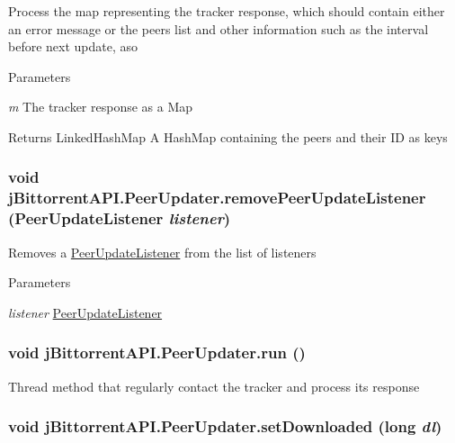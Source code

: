Process the map representing the tracker response, which should contain either an error message or the peers list and other information such as the interval before next update, aso 
\begin{DoxyParams}{Parameters}
\item[{\em m}]The tracker response as a Map \end{DoxyParams}
\begin{DoxyReturn}{Returns}
LinkedHashMap A HashMap containing the peers and their ID as keys 
\end{DoxyReturn}
\hypertarget{classj_bittorrent_a_p_i_1_1_peer_updater_adb6e86e7512b62f68d86dd2c124277cb}{
\subsubsection[{removePeerUpdateListener}]{\setlength{\rightskip}{0pt plus 5cm}void jBittorrentAPI.PeerUpdater.removePeerUpdateListener ({\bf PeerUpdateListener} {\em listener})}}
\label{classj_bittorrent_a_p_i_1_1_peer_updater_adb6e86e7512b62f68d86dd2c124277cb}
Removes a \hyperlink{interfacej_bittorrent_a_p_i_1_1_peer_update_listener}{PeerUpdateListener} from the list of listeners 
\begin{DoxyParams}{Parameters}
\item[{\em listener}]\hyperlink{interfacej_bittorrent_a_p_i_1_1_peer_update_listener}{PeerUpdateListener} \end{DoxyParams}
\hypertarget{classj_bittorrent_a_p_i_1_1_peer_updater_ae394e8d995d2c0e21377356b5fe6bd20}{
\subsubsection[{run}]{\setlength{\rightskip}{0pt plus 5cm}void jBittorrentAPI.PeerUpdater.run ()}}
\label{classj_bittorrent_a_p_i_1_1_peer_updater_ae394e8d995d2c0e21377356b5fe6bd20}
Thread method that regularly contact the tracker and process its response \hypertarget{classj_bittorrent_a_p_i_1_1_peer_updater_a2e61605bc665ddcbd7eb27818e736757}{
\subsubsection[{setDownloaded}]{\setlength{\rightskip}{0pt plus 5cm}void jBittorrentAPI.PeerUpdater.setDownloaded (long {\em dl})}}
